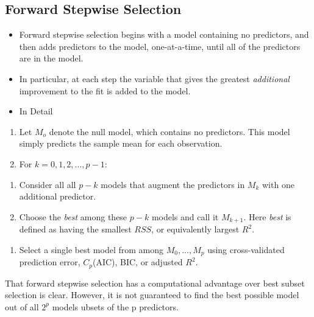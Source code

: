 \documentclass[
]{article}
\providecommand{\tightlist}{%
  \setlength{\itemsep}{0pt}\setlength{\parskip}{0pt}}
\begin{document}
\hypertarget{forward-stepwise-selection}{%
\subsection{Forward Stepwise
Selection}\label{forward-stepwise-selection}}

\begin{itemize}
\item
  Forward stepwise selection begins with a model containing no
  predictors, and then adds predictors to the model, one-at-a-time,
  until all of the predictors are in the model.
\item
  In particular, at each step the variable that gives the greatest
  \emph{additional} improvement to the fit is added to the model.
\item
  In Detail
\end{itemize}

\begin{enumerate}
\def\labelenumi{\arabic{enumi}.}
\tightlist
\item
  Let \(M_o\) denote the null model, which contains no predictors. This
  model simply predicts the sample mean for each observation.
\item
  For \(k = 0,1, 2, ...,p-1\):
\end{enumerate}

\begin{enumerate}
\def\labelenumi{\alph{enumi}.}
\tightlist
\item
  Consider all all \(p - k\) models that augment the predictors in
  \(M_k\) with one additional predictor.\\
\item
  Choose the \emph{best} among these \(p-k\) models and call it
  \(M_{k+1}\). Here \emph{best} is defined as having the smallest
  \(RSS\), or equivalently largest \(R^2\).
\end{enumerate}

\begin{enumerate}
\def\labelenumi{\arabic{enumi}.}
\setcounter{enumi}{2}
\tightlist
\item
  Select a single best model from among \(M_0,...,M_p\) using
  cross-validated prediction error, \(C_p\)(AIC), BIC, or adjusted
  \(R^2\).
\end{enumerate}

That forward stepwise selection has a computational advantage over best
subset selection is clear. However, it is not guaranteed to find the
best possible model out of all \(2^p\) models ubsets of the p
predictors.
\end{document}
